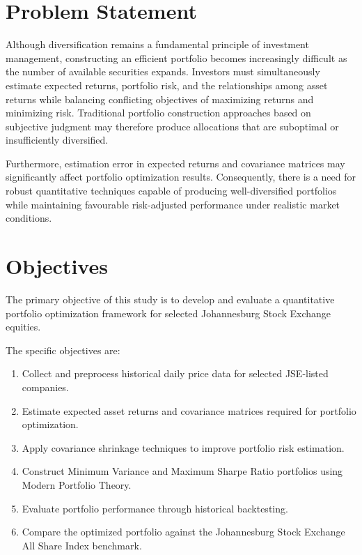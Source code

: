 \section{Problem Statement}

Although diversification remains a fundamental principle of investment management, constructing an efficient portfolio becomes increasingly difficult as the number of available securities expands. Investors must simultaneously estimate expected returns, portfolio risk, and the relationships among asset returns while balancing conflicting objectives of maximizing returns and minimizing risk. Traditional portfolio construction approaches based on subjective judgment may therefore produce allocations that are suboptimal or insufficiently diversified.

Furthermore, estimation error in expected returns and covariance matrices may significantly affect portfolio optimization results. Consequently, there is a need for robust quantitative techniques capable of producing well-diversified portfolios while maintaining favourable risk-adjusted performance under realistic market conditions.

\section{Objectives}

The primary objective of this study is to develop and evaluate a quantitative portfolio optimization framework for selected Johannesburg Stock Exchange equities.

The specific objectives are:

\begin{enumerate}
    \item Collect and preprocess historical daily price data for selected JSE-listed companies.
    
    \item Estimate expected asset returns and covariance matrices required for portfolio optimization.
    
    \item Apply covariance shrinkage techniques to improve portfolio risk estimation.
    
    \item Construct Minimum Variance and Maximum Sharpe Ratio portfolios using Modern Portfolio Theory.
    
    \item Evaluate portfolio performance through historical backtesting.
    
    \item Compare the optimized portfolio against the Johannesburg Stock Exchange All Share Index benchmark.
\end{enumerate}

